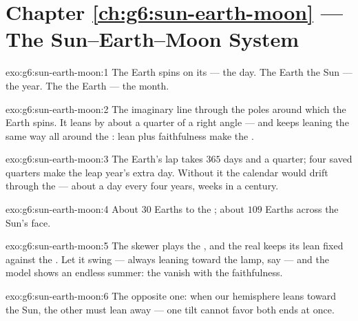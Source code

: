 \section*{Chapter \ref{ch:g6:sun-earth-moon} --- The Sun--Earth--Moon System}

\begin{solution}{exo:g6:sun-earth-moon:1}
The Earth spins on its  --- the day. The Earth  the Sun
--- the year. The   the Earth --- the month.
\end{solution}

\begin{solution}{exo:g6:sun-earth-moon:2}
The imaginary line through the poles around which the Earth spins.
It leans by about a quarter of a right angle --- and keeps leaning
the same way all around the : lean plus faithfulness make the
.
\end{solution}

\begin{solution}{exo:g6:sun-earth-moon:3}
The Earth's lap takes $365$ days and a quarter; four saved
quarters make the leap year's extra day. Without it the calendar
would drift through the  --- about a day every four years,
weeks in a century.
\end{solution}

\begin{solution}{exo:g6:sun-earth-moon:4}
About $30$ Earths to the ; about $109$ Earths across the
Sun's face.
\end{solution}

\begin{solution}{exo:g6:sun-earth-moon:5}
The skewer plays the , and the real  keeps its lean fixed
against the . Let it swing --- always leaning toward the lamp,
say --- and the model shows an endless summer: the 
vanish with the faithfulness.
\end{solution}

\begin{solution}{exo:g6:sun-earth-moon:6}
The opposite one: when our hemisphere leans toward the Sun, the
other must lean away --- one tilt cannot favor both ends at once.
\end{solution}

